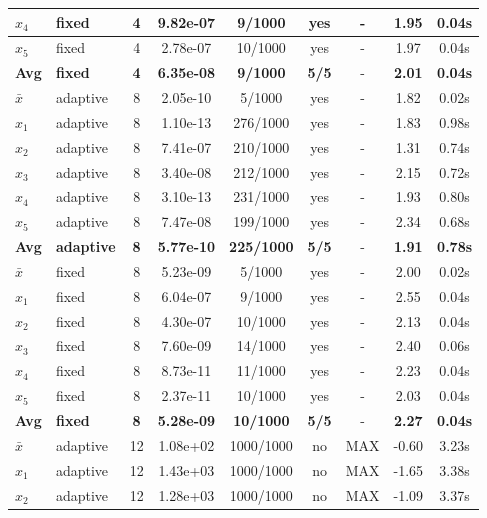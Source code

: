 \begin{longtable}{|l|l|c|c|c|c|c|c|c|}
\hline
$x_4$ & fixed & 4 & 9.82e-07 & 9/1000 & yes & - & 1.95 & 0.04s \\
\hline
$x_5$ & fixed & 4 & 2.78e-07 & 10/1000 & yes & - & 1.97 & 0.04s \\
\hline
\hline\hline
\textbf{Avg} & \textbf{fixed} & \textbf{4} & \textbf{6.35e-08} & \textbf{9/1000} & \textbf{5/5} & - & \textbf{2.01} & \textbf{0.04s} \\
\hline\hline
$\bar{x}$ & adaptive & 8 & 2.05e-10 & 5/1000 & yes & - & 1.82 & 0.02s \\
\hline
$x_1$ & adaptive & 8 & 1.10e-13 & 276/1000 & yes & - & 1.83 & 0.98s \\
\hline
$x_2$ & adaptive & 8 & 7.41e-07 & 210/1000 & yes & - & 1.31 & 0.74s \\
\hline
$x_3$ & adaptive & 8 & 3.40e-08 & 212/1000 & yes & - & 2.15 & 0.72s \\
\hline
$x_4$ & adaptive & 8 & 3.10e-13 & 231/1000 & yes & - & 1.93 & 0.80s \\
\hline
$x_5$ & adaptive & 8 & 7.47e-08 & 199/1000 & yes & - & 2.34 & 0.68s \\
\hline
\hline\hline
\textbf{Avg} & \textbf{adaptive} & \textbf{8} & \textbf{5.77e-10} & \textbf{225/1000} & \textbf{5/5} & - & \textbf{1.91} & \textbf{0.78s} \\
\hline\hline
\hline
$\bar{x}$ & fixed & 8 & 5.23e-09 & 5/1000 & yes & - & 2.00 & 0.02s \\
\hline
$x_1$ & fixed & 8 & 6.04e-07 & 9/1000 & yes & - & 2.55 & 0.04s \\
\hline
$x_2$ & fixed & 8 & 4.30e-07 & 10/1000 & yes & - & 2.13 & 0.04s \\
\hline
$x_3$ & fixed & 8 & 7.60e-09 & 14/1000 & yes & - & 2.40 & 0.06s \\
\hline
$x_4$ & fixed & 8 & 8.73e-11 & 11/1000 & yes & - & 2.23 & 0.04s \\
\hline
$x_5$ & fixed & 8 & 2.37e-11 & 10/1000 & yes & - & 2.03 & 0.04s \\
\hline
\hline\hline
\textbf{Avg} & \textbf{fixed} & \textbf{8} & \textbf{5.28e-09} & \textbf{10/1000} & \textbf{5/5} & - & \textbf{2.27} & \textbf{0.04s} \\
\hline\hline
$\bar{x}$ & adaptive & 12 & 1.08e+02 & 1000/1000 & no & MAX & -0.60 & 3.23s \\
\hline
$x_1$ & adaptive & 12 & 1.43e+03 & 1000/1000 & no & MAX & -1.65 & 3.38s \\
\hline
$x_2$ & adaptive & 12 & 1.28e+03 & 1000/1000 & no & MAX & -1.09 & 3.37s \\

\end{longtable}
